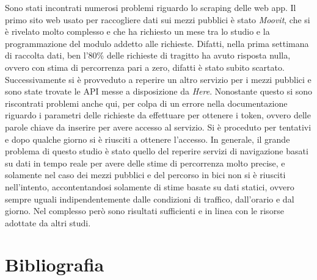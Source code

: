 \documentclass[a4paper,11pt]{article}
\begin{document}
Sono stati incontrati numerosi problemi riguardo lo scraping delle web app. Il primo sito web usato per raccogliere dati sui mezzi pubblici è stato \textit{Moovit}, che si è rivelato molto complesso e che ha richiesto un mese tra lo studio e la programmazione del modulo addetto alle richieste. Difatti, nella prima settimana di raccolta dati, ben l'80\% delle richieste di tragitto ha avuto risposta nulla, ovvero con stima di percorrenza pari a zero, difatti è stato subito scartato. Successivamente si è provveduto a reperire un altro servizio per i mezzi pubblici e sono state trovate le API messe a disposizione da \textit{Here}. Nonostante questo si sono riscontrati problemi anche qui, per colpa di un errore nella documentazione riguardo i parametri delle richieste da effettuare per ottenere i token, ovvero delle parole chiave da inserire per avere accesso al servizio. Si è proceduto per tentativi e dopo qualche giorno si è riusciti a ottenere l'accesso. In generale, il grande problema di questo studio è stato quello del reperire servizi di navigazione basati su dati in tempo reale per avere delle stime di percorrenza molto precise, e solamente nel caso dei mezzi pubblici e del percorso in bici non si è riusciti nell'intento, accontentandosi solamente di stime basate su dati statici, ovvero sempre uguali indipendentemente dalle condizioni di traffico, dall'orario e dal giorno. Nel complesso però sono risultati sufficienti e in linea con le risorse adottate da altri studi.

\section{Bibliografia}
\cite{isfortaudimob}
\cite{ellison2011travel}
\cite{faghih2017hail}
\cite{pagani2017knowledge}
\cite{chien2003dynamic}



\end{document}
